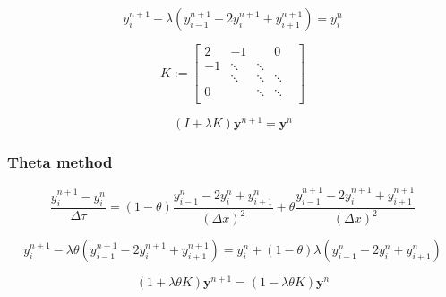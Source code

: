 \begin{equation}
  y^{n+1}_{i} - \lambda (y^{n+1}_{i-1} - 2y^{n+1}_{i} + y^{n+1}_{i+1}) = y^{n}_{i}  
\end{equation}

\begin{equation}
  K := \begin{bmatrix}
    2 & -1     & & 0 \\ 
   -1 & \ddots & \ddots \\
      & \ddots & \ddots & \ddots \\
    0 & & \ddots & \ddots & \\
  \end{bmatrix} 
\end{equation}

\begin{equation}
  (I + \lambda K)\boldsymbol{y}^{n+1} = \boldsymbol{y}^{n}
\end{equation}

\subsubsection{Theta method}

\begin{equation}
  \frac{y^{n+1}_{i} - y^{n}_{i}}{\Delta \tau} = (1-\theta)\frac{y^{n}_{i-1} - 2y^{n}_{i} + y^{n}_{i+1}}{(\Delta x)^2} +  \theta\frac{y^{n+1}_{i-1} - 2y^{n+1}_{i} + y^{n+1}_{i+1}}{(\Delta x)^2}
\end{equation}

\begin{equation}
  y^{n+1}_{i} - \lambda\theta(y^{n+1}_{i-1} - 2y^{n+1}_{i} + y^{n+1}_{i+1}) =  y^{n}_{i} + (1-\theta)\lambda(y^{n}_{i-1} - 2y^{n}_{i} + y^{n}_{i+1})
\end{equation}

\begin{equation}
  (1 + \lambda\theta K)\boldsymbol{y}^{n+1} = (1-\lambda\theta K)\boldsymbol{y}^{n} 
\end{equation}